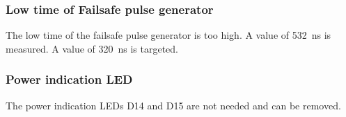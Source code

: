 \subsubsection{Low time of Failsafe pulse generator}
The low time of the failsafe pulse generator is too high. A value of \SI{532}{\nano\s} is measured. A value of \SI{320}{\nano\s} is targeted. 

\subsubsection{Power indication LED}
The power indication \acp{LED} D14 and D15 are not needed and can be removed. 
